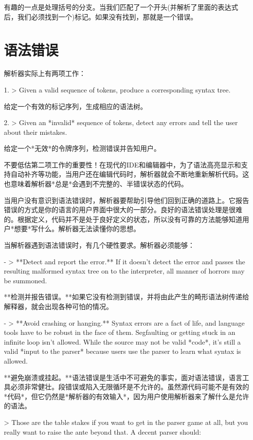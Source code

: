 \documentclass[cn,11pt,chinese]{elegantbook}
\begin{document}
有趣的一点是处理括号的分支。当我们匹配了一个开头(并解析了里面的表达式后，我们必须找到一个)标记。如果没有找到，那就是一个错误。

\section{语法错误}

解析器实际上有两项工作：

1. > Given a valid sequence of tokens, produce a corresponding syntax tree.

   给定一个有效的标记序列，生成相应的语法树。

2. > Given an *invalid* sequence of tokens, detect any errors and tell the user about their mistakes.

   给定一个*无效*的令牌序列，检测错误并告知用户。

不要低估第二项工作的重要性！在现代的IDE和编辑器中，为了语法高亮显示和支持自动补齐等功能，当用户还在编辑代码时，解析器就会不断地重新解析代码。这也意味着解析器*总是*会遇到不完整的、半错误状态的代码。

当用户没有意识到语法错误时，解析器要帮助引导他们回到正确的道路上。它报告错误的方式是你的语言的用户界面中很大的一部分。良好的语法错误处理是很难的。根据定义，代码并不是处于良好定义的状态，所以没有可靠的方法能够知道用户*想要*写什么。解析器无法读懂你的思想。

当解析器遇到语法错误时，有几个硬性要求。解析器必须能够：

- > **Detect and report the error.** If it doesn’t detect the error and passes the resulting malformed syntax tree on to the interpreter, all manner of horrors may be summoned.

  **检测并报告错误。**如果它没有检测到错误，并将由此产生的畸形语法树传递给解释器，就会出现各种可怕的情况。

- > **Avoid crashing or hanging.** Syntax errors are a fact of life, and language tools have to be robust in the face of them. Segfaulting or getting stuck in an infinite loop isn’t allowed. While the source may not be valid *code*, it’s still a valid *input to the parser* because users use the parser to learn what syntax is allowed.

  **避免崩溃或挂起。**语法错误是生活中不可避免的事实，面对语法错误，语言工具必须非常健壮。段错误或陷入无限循环是不允许的。虽然源代码可能不是有效的*代码*，但它仍然是*解析器的有效输入*，因为用户使用解析器来了解什么是允许的语法。

> Those are the table stakes if you want to get in the parser game at all, but you really want to raise the ante beyond that. A decent parser should:
\end{document}
